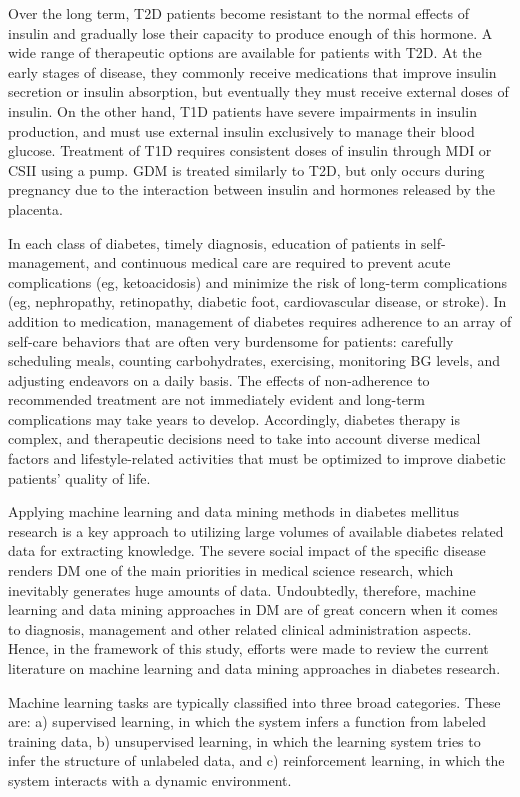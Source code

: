 \documentclass[12pt]{article}
\begin{document}
Over the long term, T2D patients become resistant to the normal effects of insulin and gradually lose their capacity to produce enough of this hormone. A wide range of therapeutic options are available for patients with T2D. At the early stages of disease, they commonly receive medications that improve insulin secretion or insulin absorption, but eventually they must receive external doses of insulin. On the other hand, T1D patients have severe impairments in insulin production, and must use external insulin exclusively to manage their blood glucose. Treatment of T1D requires consistent doses of insulin through MDI or CSII using a pump. GDM is treated similarly to T2D, but only occurs during pregnancy due to the interaction between insulin and hormones released by the placenta.

In each class of diabetes, timely diagnosis, education of patients in self-management, and continuous medical care are required to prevent acute complications (eg, ketoacidosis) and minimize the risk of long-term complications (eg, nephropathy, retinopathy, diabetic foot, cardiovascular disease, or stroke). In addition to medication, management of diabetes requires adherence to an array of self-care behaviors that are often very burdensome for patients: carefully scheduling meals, counting carbohydrates, exercising, monitoring BG levels, and adjusting endeavors on a daily basis. The effects of non-adherence to recommended treatment are not immediately evident and long-term complications may take years to develop. Accordingly, diabetes therapy is complex, and therapeutic decisions need to take into account diverse medical factors and lifestyle-related activities that must be optimized to improve diabetic patients’ quality of life.

Applying machine learning and data mining methods in diabetes mellitus research is a key approach to utilizing large volumes of available diabetes related data for extracting knowledge. The severe social impact of the specific disease renders DM one of the main priorities in medical science research, which inevitably generates huge amounts of data. Undoubtedly, therefore, machine learning and data mining approaches in DM are of great concern when it comes to diagnosis, management and other related clinical administration aspects. Hence, in the framework of this study, efforts were made to review the current literature on machine learning and data mining approaches in diabetes research.

Machine learning tasks are typically classified into three broad categories. These are: a) supervised learning, in which the system infers a function from labeled training data, b) unsupervised learning, in which the learning system tries to infer the structure of unlabeled data, and c) reinforcement learning, in which the system interacts with a dynamic environment.
\end{document}
